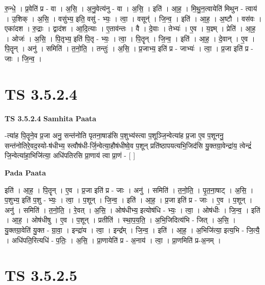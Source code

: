 \documentclass[17pt]{extarticle}
\begin{document}
रु॒न्धे॒ । प्र॒वेति॑ प्र - वा । अ॒सि॒ । अ॒नु॒वेत्य॑नु - वा । अ॒सि॒ । इति॑ । आ॒ह॒ । मि॒थु॒न॒त्वायेति॑ मिथुन - त्वाय॑ । उ॒शिक् । अ॒सि॒ । वसु॑भ्य॒ इति॒ वसु॑ - भ्यः॒ । त्वा॒ । वसून्॑ । जि॒न्व॒ । इति॑ । आ॒ह॒ । अ॒ष्टौ । वस॑वः । एका॑दश । रु॒द्राः । द्वाद॑श । आ॒दि॒त्याः । ए॒ताव॑न्तः । वै । दे॒वाः । तेभ्यः॑ । ए॒व । य॒ज्ञ्म् । प्रेति॑ । आ॒ह॒ । ओजः॑ । अ॒सि॒ । पि॒तृभ्य॒ इति॑ पि॒तृ - भ्यः॒ । त्वा॒ । पि॒तॄन् । जि॒न्व॒ । इति॑ । आ॒ह॒ । दे॒वान् । ए॒व । पि॒तॄन् । अनु॑ । समिति॑ । त॒नो॒ति॒ । तन्तुः॑ । अ॒सि॒ । प्र॒जाभ्य॒ इति॑ प्र - जाभ्यः॑ । त्वा॒ । प्र॒जा इति॑ प्र - जाः । जि॒न्व॒ ।  \newline





\section{ TS 3.5.2.4 }

\textbf{TS 3.5.2.4 } \newline
\textbf{Samhita Paata} \newline

-त्या॑ह पि॒तॄने॒व प्र॒जा अनु॒ सन्त॑नोति पृतना॒षाड॑सि प॒शुभ्य॑स्त्वा प॒शूञ्जि॒न्वेत्या॑ह प्र॒जा ए॒व प॒शूननु॒ सन्त॑नोतिरे॒वद॒स्यो-ष॑धीभ्य॒ स्त्वौष॑धी-र्जि॒न्वेत्या॒हौष॑धीष्वे॒व प॒शून् प्रति॑ष्ठापयत्यभि॒जिद॑सि यु॒क्तग्रा॒वेन्द्रा॑य॒ त्वेन्द्रं॑ जि॒न्वेत्या॑हा॒भिजि॑त्या॒ अधि॑पतिरसि प्रा॒णाय॑ त्वा प्रा॒णं - [  ] \newline

\textbf{Pada Paata} \newline

इति॑ । आ॒ह॒ । पि॒तॄन् । ए॒व । प्र॒जा इति॑ प्र - जाः । अनु॑ । समिति॑ । त॒नो॒ति॒ । पृ॒त॒ना॒षाट् । अ॒सि॒ । प॒शुभ्य॒ इति॑ प॒शु - भ्यः॒ । त्वा॒ । प॒शून् । जि॒न्व॒ । इति॑ । आ॒ह॒ । प्र॒जा इति॑ प्र - जाः । ए॒व । प॒शून् । अनु॑ । समिति॑ । त॒नो॒ति॒ । रे॒वत् । अ॒सि॒ । ओष॑धीभ्य॒ इत्योष॑धि - भ्यः॒ । त्वा॒ । ओष॑धीः । जि॒न्व॒ । इति॑ । आ॒ह॒ । ओष॑धीषु । ए॒व । प॒शून् । प्रतीति॑ । स्था॒प॒य॒ति॒ । अ॒भि॒जिदित्य॑भि - जित् । अ॒सि॒ । यु॒क्तग्रा॒वेति॑ यु॒क्त - ग्रा॒वा॒ । इन्द्रा॑य । त्वा॒ । इन्द्र᳚म् । जि॒न्व॒ । इति॑ । आ॒ह॒ । अ॒भिजि॑त्या॒ इत्य॒भि - जि॒त्यै॒ । अधि॑पति॒रित्यधि॑ - प॒तिः॒ । अ॒सि॒ । प्रा॒णायेति॑ प्र - अ॒नाय॑ । त्वा॒ । प्रा॒णमिति॑ प्र-अ॒नम् ।  \newline





\section{ TS 3.5.2.5 }
\end{document}
